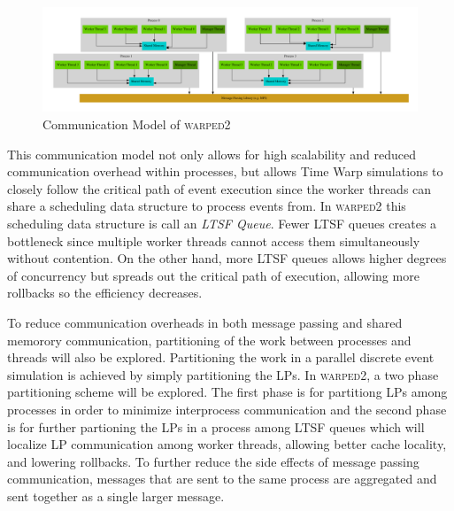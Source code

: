 \documentclass[11pt]{book}
\begin{document}
\begin{figure}
    \centering
    \includegraphics[width=\textwidth,quiet]{figs/graphviz/warped_communication.pdf}
    \caption{Communication Model of \textsc{warped2}}\label{warped2_communication}
\end{figure}

\noindent
This communication model not only allows for high scalability and reduced communication
overhead within processes, but allows Time Warp simulations to closely follow the critical
path of event execution since the worker threads can share a scheduling data structure to
process events from.  In \textsc{warped2} this scheduling data structure is call an
\emph{LTSF Queue}.  Fewer LTSF queues creates a bottleneck since multiple worker threads
cannot access them simultaneously without contention.  On the other hand, more LTSF queues
allows higher degrees of concurrency but spreads out the critical path of execution,
allowing more rollbacks so the efficiency decreases.

To reduce communication overheads in both message passing and shared memorory communication,
partitioning of the work between processes and threads will also be explored.  Partitioning
the work in a parallel discrete event simulation is achieved by simply partitioning the
LPs.  In \textsc{warped2}, a two phase partitioning scheme will be explored.  The first phase
is for partitiong LPs among processes in order to minimize interprocess communication and the
second phase is for further partioning the LPs in a process among LTSF queues
which will localize LP communication among worker threads, allowing better cache locality,
and lowering rollbacks.  To further reduce the side effects of message passing communication,
messages that are sent to the same process are aggregated and sent together as a single larger
message.

\end{document}
